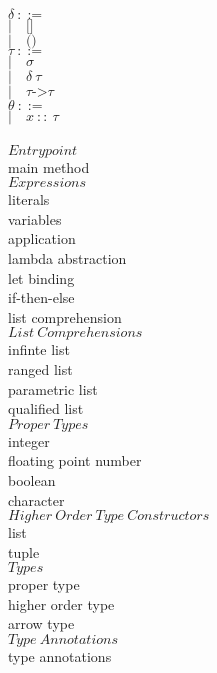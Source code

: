﻿\documentclass[5pt]{article}
\begin{document}
\begin{multicols}{2}
\noindent $\delta \ ::= $ \\
\hspace*{10mm} $| \quad \texttt{[]} $ \\
\hspace*{10mm} $| \quad \texttt{()} $ \\

\noindent $\tau \ ::= $ \\
\hspace*{10mm} $| \quad \sigma $ \\
\hspace*{10mm} $| \quad \delta \ \tau $ \\
\hspace*{10mm} $| \quad \tau \texttt{->} \tau $ \\

\noindent $\theta \ ::= $ \\
\hspace*{10mm} $| \quad x \ :: \  \tau $ \\
\columnbreak \\
$Entrypoint$ \\
main method \\

\noindent $Expressions$ \\
literals \\
variables \\
application \\
lambda abstraction \\
let binding \\
if-then-else \\
list comprehension \\

\noindent $List \ Comprehensions$ \\
infinte list \\
ranged list \\
parametric list \\
qualified list \\

\noindent $Proper \ Types$ \\
integer \\
floating point number \\
boolean \\
character \\

\noindent $Higher \ Order \ Type \ Constructors$ \\
list \\
tuple \\

\noindent $Types$ \\
proper type \\
higher order type \\
arrow type \\

\noindent $Type \ Annotations$ \\
type annotations \\
\end{multicols}
\end{document}
